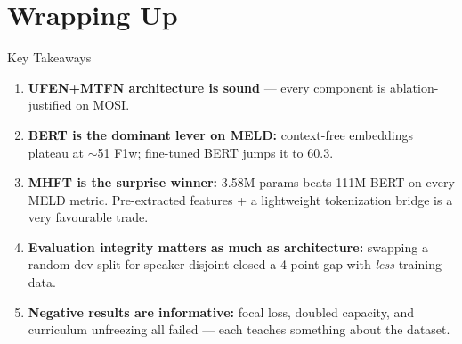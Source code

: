\documentclass[aspectratio=169,10pt]{beamer}
\begin{document}
\section{Wrapping Up}

\begin{frame}{Key Takeaways}
  \small
  \begin{enumerate}
    \item \textbf{UFEN+MTFN architecture is sound} --- every component is ablation-justified on MOSI.
    \item \textbf{BERT is the dominant lever on MELD:} context-free embeddings plateau at $\sim$51 F1w; fine-tuned BERT jumps it to 60.3.
    \item \textbf{MHFT is the surprise winner:} 3.58M params beats 111M BERT on every MELD metric. Pre-extracted features + a lightweight tokenization bridge is a very favourable trade.
    \item \textbf{Evaluation integrity matters as much as architecture:} swapping a random dev split for speaker-disjoint closed a 4-point gap with \emph{less} training data.
    \item \textbf{Negative results are informative:} focal loss, doubled capacity, and curriculum unfreezing all failed --- each teaches something about the dataset.
  \end{enumerate}
\end{frame}
\end{document}
